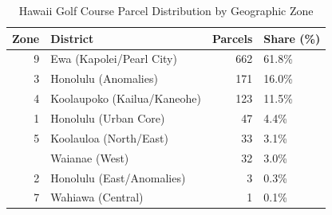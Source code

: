 \begin{table}[!h]
\centering
\caption{\label{tab:hawaii_geo}Hawaii Golf Course Parcel Distribution by Geographic Zone}
\centering
\begin{tabular}[t]{rlrl}
\toprule
Zone & District & Parcels & Share (\%)\\
\midrule
9 & Ewa (Kapolei/Pearl City) & 662 & 61.8\%\\
3 & Honolulu (Anomalies) & 171 & 16.0\%\\
4 & Koolaupoko (Kailua/Kaneohe) & 123 & 11.5\%\\
1 & Honolulu (Urban Core) & 47 & 4.4\%\\
5 & Koolauloa (North/East) & 33 & 3.1\%\\
\addlinespace
8 & Waianae (West) & 32 & 3.0\%\\
2 & Honolulu (East/Anomalies) & 3 & 0.3\%\\
7 & Wahiawa (Central) & 1 & 0.1\%\\
\bottomrule
\end{tabular}
\end{table}
